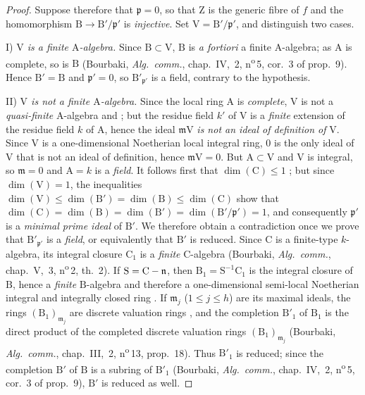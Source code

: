 \begin{proof}
Suppose therefore that $\mathfrak{p}=0$, so that $\mathrm{Z}$ is the generic fibre of $f$ and the homomorphism $\mathrm{B}\to\mathrm{B}'/\mathfrak{p}'$ is \emph{injective}. Set $\mathrm{V}=\mathrm{B}'/\mathfrak{p}'$, and distinguish two cases.

I) \emph{$\mathrm{V}$ is a finite $\mathrm{A}$-algebra.} Since $\mathrm{B}\subset\mathrm{V}$, $\mathrm{B}$ is \emph{a fortiori} a finite $\mathrm{A}$-algebra; as $\mathrm{A}$ is complete, so is $\mathrm{B}$ (Bourbaki, \emph{Alg.\ comm.}, chap.~IV, \textsection\,2, n\textsuperscript{o}\,5, cor.~3 of prop.~9). Hence $\mathrm{B}'=\mathrm{B}$ and $\mathfrak{p}'=0$, so $\mathrm{B}'_{\mathfrak{p}'}$ is a field, contrary to the hypothesis.

II) \emph{$\mathrm{V}$ is not a finite $\mathrm{A}$-algebra.} Since the local ring $\mathrm{A}$ is \emph{complete}, $\mathrm{V}$ is not a \emph{quasi-finite} $\mathrm{A}$-algebra  and ; but the residue field $k'$ of $\mathrm{V}$ is a \emph{finite} extension of the residue field $k$ of $\mathrm{A}$,
hence  the ideal $\mathfrak{m}\mathrm{V}$ \emph{is not an ideal of definition of} $\mathrm{V}$. Since $\mathrm{V}$ is a one-dimensional Noetherian local integral ring, $0$ is the only ideal of $\mathrm{V}$ that is not an ideal of definition, hence $\mathfrak{m}\mathrm{V}=0$. But $\mathrm{A}\subset\mathrm{V}$ and $\mathrm{V}$ is integral, so $\mathfrak{m}=0$ and $\mathrm{A}=k$ is a \emph{field}.
It follows first that $\dim(\mathrm{C})\leqslant 1$ ; but since $\dim(\mathrm{V})=1$, the inequalities $\dim(\mathrm{V})\leqslant\dim(\mathrm{B}')=\dim(\mathrm{B})\leqslant\dim(\mathrm{C})$
show that $\dim(\mathrm{C})=\dim(\mathrm{B})=\dim(\mathrm{B}')=\dim(\mathrm{B}'/\mathfrak{p}')=1$, and consequently $\mathfrak{p}'$ is a \emph{minimal prime ideal} of $\mathrm{B}'$. We therefore obtain a contradiction once we prove that $\mathrm{B}'_{\mathfrak{p}'}$ is a \emph{field}, or equivalently that $\mathrm{B}'$ is reduced.
Since $\mathrm{C}$ is a finite-type $k$-algebra, its integral closure $\mathrm{C}_1$ is a \emph{finite} $\mathrm{C}$-algebra (Bourbaki, \emph{Alg.\ comm.}, chap.~V, \textsection\,3, n\textsuperscript{o}\,2, th.~2). If $\mathrm{S}=\mathrm{C}-\mathfrak{n}$, then $\mathrm{B}_1=\mathrm{S}^{-1}\mathrm{C}_1$ is the integral closure of $\mathrm{B}$, hence a \emph{finite} $\mathrm{B}$-algebra and therefore a one-dimensional semi-local Noetherian integral and integrally closed ring . If $\mathfrak{m}_j$ ($1\leqslant j\leqslant h$) are its maximal ideals, the rings $(\mathrm{B}_1)_{\mathfrak{m}_j}$ are discrete valuation rings , and the completion $\mathrm{B}'_1$ of $\mathrm{B}_1$ is the direct product of the completed discrete valuation rings $(\mathrm{B}_1)_{\mathfrak{m}_j}$ (Bourbaki, \emph{Alg.\ comm.}, chap.~III, \textsection\,2, n\textsuperscript{o}\,13, prop.~18). Thus $\mathrm{B}'_1$ is reduced; since the completion $\mathrm{B}'$ of $\mathrm{B}$ is a subring of $\mathrm{B}'_1$ (Bourbaki, \emph{Alg.\ comm.}, chap.~IV, \textsection\,2, n\textsuperscript{o}\,5, cor.~3 of prop.~9), $\mathrm{B}'$ is reduced as well.

\end{proof}
